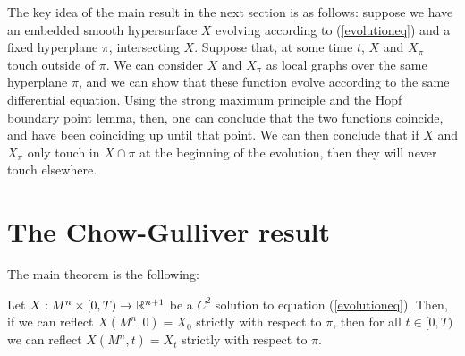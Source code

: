 The key idea of the main result in the next section is as follows: suppose we have an embedded smooth hypersurface $X$ evolving according to (\ref{evolutioneq}) and a fixed hyperplane $\pi$, intersecting $X$. Suppose that, at some time $t$, $X$ and  $X_\pi$ touch outside of $\pi$. We can consider $X$ and  $X_\pi$ as local graphs over the same hyperplane $\pi$, and we can show that these function evolve according to the same differential equation. Using the strong maximum principle and the Hopf boundary point lemma, then, one can conclude that the two functions coincide, and have been coinciding up until that point. We can then conclude that if  $X$ and  $X_\pi$ only touch in $X\cap\pi$ at the beginning of the evolution, then they will never touch elsewhere.  


\section{The Chow-Gulliver result}

The main theorem is the following: 

\begin{theorem}\label{chow gulliver}
	Let $X:M^n\times [0,T) \rightarrow \mathbb{R}^{n+1}$ be a $C^2$ solution to equation (\ref{evolutioneq}). Then, if we can reflect $X(M^n, 0)=X_0$ strictly with respect to $\pi$, then for all $t\in [0,T)$ we can reflect $X(M^n, t)=X_t$ strictly with respect to $\pi$. 
\end{theorem}

